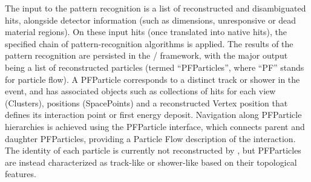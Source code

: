 


The input to the  pattern recognition is a list of reconstructed and disambiguated \twod hits, alongside detector information (such as dimensions, unresponsive or dead material regions). On these input hits (once translated into native  \twod hits), the specified chain of pattern-recognition algorithms is applied. The results of the pattern recognition are persisted in the / framework, with the major output being a list of reconstructed \threed particles (termed ``PFParticles'', where ``PF'' stands for particle flow). A PFParticle corresponds to a distinct track or shower in the event, and has associated objects such as collections of \twod hits for each view (Clusters), \threed positions (SpacePoints) and a reconstructed Vertex position that defines its interaction point or first energy deposit. Navigation along PFParticle hierarchies is achieved using the PFParticle interface, which connects parent and daughter PFParticles, providing a Particle Flow description of the interaction. The identity of each particle is currently not reconstructed by , but PFParticles are instead characterized as track-like or shower-like based on their topological features. 

